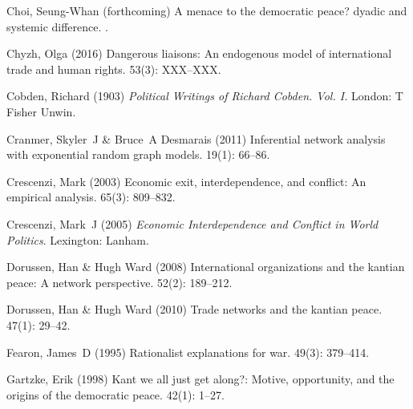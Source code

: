 \documentclass[12pt]{article}
\theoremstyle{hypothesis}
\begin{document}
\begin{thebibliography}{}
Choi, Seung-Whan (forthcoming) A menace to the democratic peace? dyadic and systemic
  difference.
.

Chyzh, Olga (2016) Dangerous liaisons: An endogenous model of international trade and human rights.
 { 53\/}(3): XXX--XXX.

Cobden, Richard (1903) {\em Political Writings of Richard Cobden. Vol. I.}
\newblock London: T Fisher Unwin.

Cranmer, Skyler~J  \& Bruce~A Desmarais (2011) Inferential network analysis
  with exponential random graph models.
 { 19\/}(1): 66--86.

Crescenzi, Mark (2003) Economic exit, interdependence, and conflict: An
  empirical analysis.
 { 65\/}(3): 809--832.

Crescenzi, Mark~J (2005) {\em Economic Interdependence and Conflict in World
  Politics}.
\newblock Lexington: Lanham.

Dorussen, Han  \& Hugh Ward (2008) International organizations and the kantian
  peace: A network perspective.
 { 52\/}(2): 189--212.

Dorussen, Han  \& Hugh Ward (2010) Trade networks and the kantian peace.
 { 47\/}(1): 29--42.

Fearon, James~D (1995) Rationalist explanations for war.
 { 49\/}(3): 379--414.

Gartzke, Erik (1998) Kant we all just get along?: Motive, opportunity, and the
  origins of the democratic peace.
 { 42\/}(1): 1--27.


\end{thebibliography}
\end{document}
